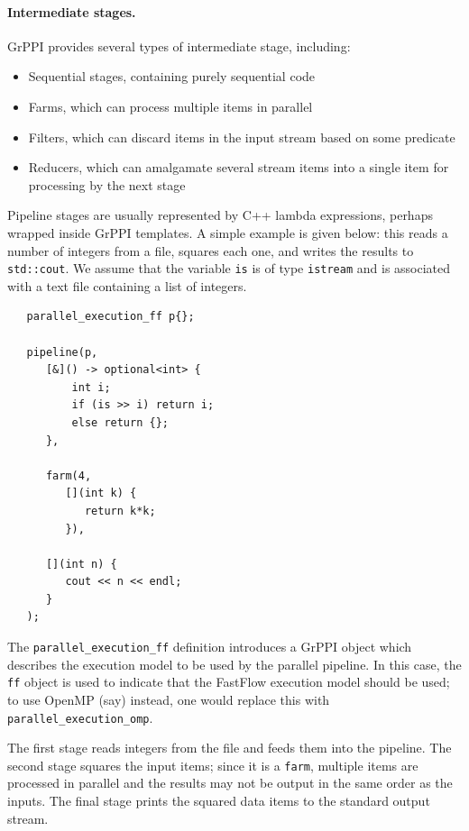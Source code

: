 \paragraph{Intermediate stages.} GrPPI provides several types of intermediate stage, including:
\begin{itemize}
\item Sequential stages, containing purely sequential code
\item Farms, which can process multiple items in parallel
\item Filters, which can discard items in the input stream based on some predicate
\item Reducers, which can amalgamate several stream items into a single item for processing by the next stage
\end{itemize}

Pipeline stages are usually represented by C++ lambda expressions,
perhaps wrapped inside GrPPI templates.  A simple example is given
below: this reads a number of integers from a file, squares each one,
and writes the results to \verb|std::cout|. We assume that the
variable \verb|is| is of type \verb|istream| and is associated
with a text file containing a list of integers.

{\scriptsize
\begin{lstlisting}
   parallel_execution_ff p{};

   pipeline(p,
      [&]() -> optional<int> {
          int i;
          if (is >> i) return i;
          else return {};
      },

      farm(4,
         [](int k) {
            return k*k;
         }),

      [](int n) {
         cout << n << endl;
      }
   );
\end{lstlisting}
}

The \verb|parallel_execution_ff| definition introduces a GrPPI
object which describes the execution model to be used by 
the parallel pipeline. In this case, the \verb|ff| object is
used to indicate that the FastFlow execution model should be used; 
to use OpenMP (say) instead, one would replace this with \verb|parallel_execution_omp|.

The first stage reads integers from the file and feeds them into the pipeline.
The second stage squares the input items; since it is a \verb|farm|,
multiple items are processed in parallel and the results may not be output
in the same order as the inputs.
The final stage prints the squared data items to the standard output stream.


